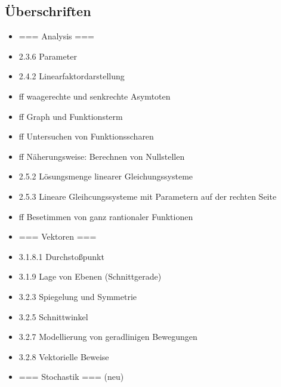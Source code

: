 \subsection{Überschriften}
\begin{itemize}
    \item === Analysis ===
    \item 2.3.6 Parameter
    \item 2.4.2 Linearfaktordarstellung
    \item ff waagerechte und senkrechte Asymtoten
    \item ff Graph und Funktionsterm
    \item ff Untersuchen von Funktionsscharen
    \item ff Näherungsweise: Berechnen von Nullstellen
    \item 2.5.2 Lösungsmenge linearer Gleichungssysteme
    \item 2.5.3 Lineare Gleihcungssysteme mit Parametern auf der rechten Seite
    \item ff Besetimmen von ganz rantionaler Funktionen
    \item === Vektoren ===
    \item 3.1.8.1 Durchstoßpunkt
    \item 3.1.9 Lage von Ebenen (Schnittgerade)
    \item 3.2.3 Spiegelung und Symmetrie
    \item 3.2.5 Schnittwinkel
    \item 3.2.7 Modellierung von geradlinigen Bewegungen
    \item 3.2.8 Vektorielle Beweise
    \item === Stochastik === (neu)
\end{itemize}

